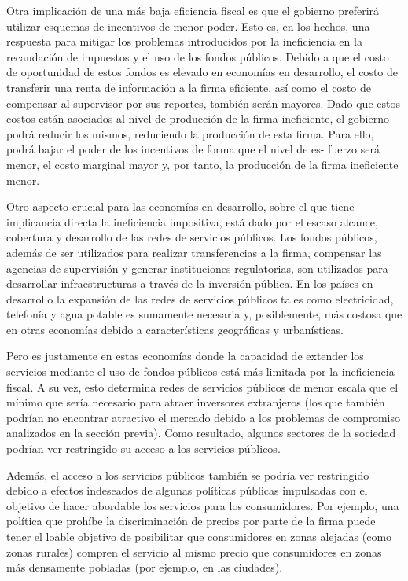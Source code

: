 \documentclass[
  12pt,
  spanish,
]{book}
\begin{document}
Otra implicación de una más baja eficiencia fiscal es que el gobierno
preferirá utilizar esquemas de incentivos de menor poder. Esto es, en
los hechos, una respuesta para mitigar los problemas introducidos por la
ineficiencia en la recaudación de impuestos y el uso de los fondos
públicos. Debido a que el costo de oportunidad de estos fondos es
elevado en economías en desarrollo, el costo de transferir una renta de
información a la firma eficiente, así como el costo de compensar al
supervisor por sus reportes, también serán mayores. Dado que estos
costos están asociados al nivel de producción de la firma ineficiente,
el gobierno podrá reducir los mismos, reduciendo la producción de esta
firma. Para ello, podrá bajar el poder de los incentivos de forma que el
nivel de es- fuerzo será menor, el costo marginal mayor y, por tanto, la
producción de la firma ineficiente menor.

Otro aspecto crucial para las economías en desarrollo, sobre el que
tiene implicancia directa la ineficiencia impositiva, está dado por el
escaso alcance, cobertura y desarrollo de las redes de servicios
públicos. Los fondos públicos, además de ser utilizados para realizar
transferencias a la firma, compensar las agencias de supervisión y
generar instituciones regulatorias, son utilizados para desarrollar
infraestructuras a través de la inversión pública. En los países en
desarrollo la expansión de las redes de servicios públicos tales como
electricidad, telefonía y agua potable es sumamente necesaria y,
posiblemente, más costosa que en otras economías debido a
características geográficas y urbanísticas.

Pero es justamente en estas economías donde la capacidad de extender los
servicios mediante el uso de fondos públicos está más limitada por la
ineficiencia fiscal. A su vez, esto determina redes de servicios
públicos de menor escala que el mínimo que sería necesario para atraer
inversores extranjeros (los que también podrían no encontrar atractivo
el mercado debido a los problemas de compromiso analizados en la sección
previa). Como resultado, algunos sectores de la sociedad podrían ver
restringido su acceso a los servicios públicos.

Además, el acceso a los servicios públicos también se podría ver
restringido debido a efectos indeseados de algunas políticas públicas
impulsadas con el objetivo de hacer abordable los servicios para los
consumidores. Por ejemplo, una política que prohíbe la discriminación de
precios por parte de la firma puede tener el loable objetivo de
posibilitar que consumidores en zonas alejadas (como zonas rurales)
compren el servicio al mismo precio que consumidores en zonas más
densamente pobladas (por ejemplo, en las ciudades).
\end{document}

